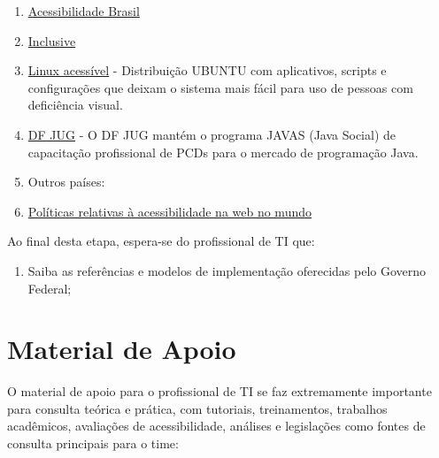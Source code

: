 \documentclass[
  12pt,
  openright,
  twoside,
  a4paper,
  english,
  french,
  spanish,
  brazil
]{abntex2}
\begin{document}
\begin{enumerate}
\begin{enumerate}
    \item \href{http://www.acessobrasil.org.br}{Acessibilidade Brasil}
    \item \href{http://www.inclusive.org.br}{Inclusive}
    \item
      \href{http://www.acessibilidadelegal.com/33-linux.php}{Linux acessível} -
      Distribuição UBUNTU com aplicativos, scripts e configurações que deixam o
      sistema mais fácil para uso de pessoas com deficiência visual.
    \item
      \href{https://www.linkedin.com/company/dfjug/about}{DF JUG} - O DF JUG
      mantém o programa JAVAS (Java Social) de capacitação profissional de PCDs
      para o mercado de programação Java.
    \item Outros países:
    \item
      \href{
        https://www.w3.org/WAI/Policy
      }{Políticas relativas à acessibilidade na web no mundo}
  \end{enumerate}
\end{enumerate}

Ao final desta etapa, espera-se do profissional de TI que:

\begin{enumerate}
  \item
    Saiba as referências e modelos de implementação oferecidas pelo Governo
    Federal;
\end{enumerate}

\chapter{Material de Apoio}

O material de apoio para o profissional de TI se faz extremamente importante
para consulta teórica e prática, com tutoriais, treinamentos, trabalhos
acadêmicos, avaliações de acessibilidade, análises e legislações como fontes de
consulta principais para o time:
\end{document}
